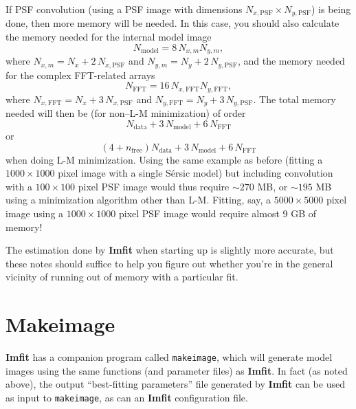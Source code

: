 \documentclass[10pt,a4paper,article]{memoir}
\newcommand{\imfit}{\textbf{Imfit}}
\newcommand{\Imfit}{\textbf{Imfit}}
\newcommand{\makeimage}{\texttt{makeimage}}
\begin{document}
If PSF convolution (using a PSF image with dimensions $N_{x,\mathrm{PSF}} \times N_{y,\mathrm{PSF}}$)
is being done, then more memory will be needed. In this case, you should also calculate the 
memory needed for the internal model image
\begin{equation}
N_{\mathrm{model}} = 8 \, N_{x,m} N_{y,m},
\end{equation}
where $N_{x,m} = N_{x} + 2 \, N_{x,\mathrm{PSF}}$ and $N_{y,m} = N_{y} + 2 \, N_{y,\mathrm{PSF}}$,
and the memory needed for the complex FFT-related arrays
\begin{equation}
N_{\mathrm{FFT}} = 16 \, N_{x,\mathrm{FFT}} N_{y,\mathrm{FFT}},
\end{equation}
where $N_{x,\mathrm{FFT}} = N_{x} + 3 \, N_{x,\mathrm{PSF}}$ and 
$N_{y,\mathrm{FFT}} = N_{y} + 3 \, N_{y,\mathrm{PSF}}$. The total memory needed will
then be (for non--L-M minimization) of order
\begin{equation}
N_{\mathrm{data}} + 3 \, N_{\mathrm{model}} + 6 \, N_{\mathrm{FFT}}
\end{equation}
or
\begin{equation}
(4 + n_{\mathrm{free}}) N_{\mathrm{data}} + 3 \, N_{\mathrm{model}} + 6 \, N_{\mathrm{FFT}}
\end{equation}
when doing L-M minimization. Using the same example as before (fitting a
$1000 \times 1000$ pixel image with a single S\'ersic model) but
including convolution with a $100 \times 100$ pixel PSF image would thus
require $\sim 270$ MB, or $\sim 195$ MB using a minimization algorithm other than L-M.
Fitting, say, a $5000 \times 5000$ pixel image using a $1000 \times
1000$ pixel PSF image would require almost 9 GB of memory!

The estimation done by \imfit{} when starting up is slightly more accurate, but these
notes should suffice to help you figure out whether you're in the general vicinity of running out
of memory with a particular fit.




\newpage

\chapter{Makeimage}

\Imfit{} has a companion program called \makeimage, which will generate model
images using the same functions (and parameter files) as \imfit. In fact (as
noted above), the output ``best-fitting parameters'' file generated by \imfit{}
can be used as input to \makeimage, as can an \imfit{} configuration file.
\end{document}
